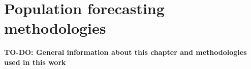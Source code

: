 \section{Population forecasting methodologies}
\textbf{TO-DO: General information about this chapter and methodologies used in this work}